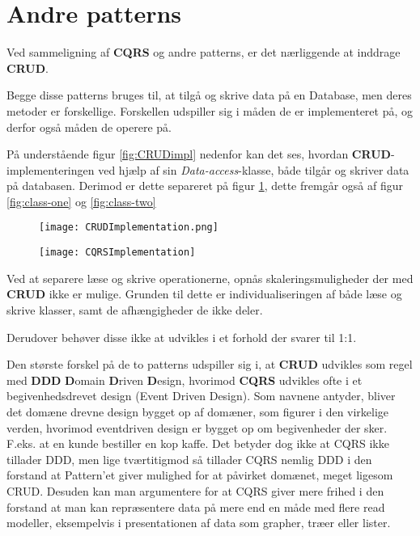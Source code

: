 \section{Andre patterns}
Ved sammeligning af \textbf{CQRS} og andre patterns, er det nærliggende at inddrage \textbf{CRUD}.

Begge disse patterns bruges til, at tilgå og skrive data på en Database, men deres metoder er forskellige. Forskellen udspiller sig i måden de er implementeret på, og derfor også måden de operere på.\newline

På understående figur \ref{fig:CRUDimpl} nedenfor kan det ses, hvordan \textbf{CRUD}-implementeringen ved hjælp af sin \textit{Data-access}-klasse, både tilgår og skriver data på databasen. Derimod er dette separeret på figur \ref{fig:CQRSimpl}, dette fremgår også af figur \ref{fig:class-one} og \ref{fig:class-two}

\begin{figure}[H]
	\centering
	\begin{minipage}{.5\textwidth}
		\centering
		\texttt{[image: CRUDImplementation.png]}
		\label{fig:CRUDimpl}
	\end{minipage}%
	\begin{minipage}{.5\textwidth}
		\centering
		\texttt{[image: CQRSImplementation]}
		\label{fig:CQRSimpl}
	\end{minipage}
\end{figure}


Ved at separere læse og skrive operationerne, opnås skaleringsmuligheder der med \textbf{CRUD} ikke er mulige. Grunden til dette er individualiseringen af både læse og skrive klasser, samt de afhængigheder de ikke deler.\newline

Derudover behøver disse ikke at udvikles i et forhold der svarer til 1:1.\newline

Den største forskel på de to patterns udspiller sig i, at \textbf{CRUD} udvikles som regel med \textbf{DDD} \textbf{D}omain \textbf{D}riven \textbf{D}esign, hvorimod \textbf{CQRS} udvikles ofte i et begivenhedsdrevet design (Event Driven Design). Som navnene antyder, bliver det domæne drevne design bygget op af domæner, som figurer i den virkelige verden, hvorimod eventdriven design er bygget op om begivenheder der sker. F.eks. at en kunde bestiller en kop kaffe. Det betyder dog ikke at CQRS ikke tillader DDD, men lige tværtitigmod så tillader CQRS nemlig DDD i den forstand at Pattern'et giver mulighed for at påvirket domænet, meget ligesom CRUD. Desuden kan man argumentere for at CQRS giver mere frihed i den forstand at man kan repræsentere data på mere end en måde med flere read modeller, eksempelvis i presentationen af data som grapher, træer eller lister. \newline

